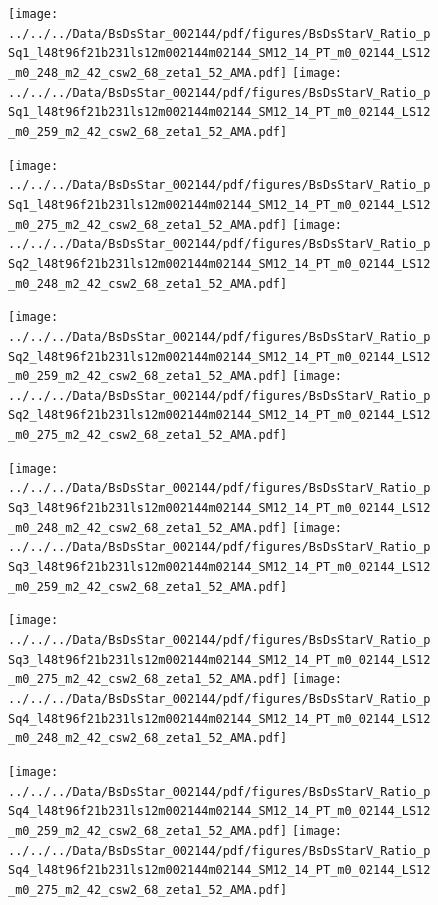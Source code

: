 \documentclass[a4paper,10pt]{article}
\begin{document}
\begin{figure}[p]
 \texttt{[image: ../../../Data/BsDsStar\_002144/pdf/figures/BsDsStarV\_Ratio\_pSq1\_l48t96f21b231ls12m002144m02144\_SM12\_14\_PT\_m0\_02144\_LS12\_m0\_248\_m2\_42\_csw2\_68\_zeta1\_52\_AMA.pdf]} 
 \texttt{[image: ../../../Data/BsDsStar\_002144/pdf/figures/BsDsStarV\_Ratio\_pSq1\_l48t96f21b231ls12m002144m02144\_SM12\_14\_PT\_m0\_02144\_LS12\_m0\_259\_m2\_42\_csw2\_68\_zeta1\_52\_AMA.pdf]} 
 \end{figure}
\begin{figure}[p]
 \texttt{[image: ../../../Data/BsDsStar\_002144/pdf/figures/BsDsStarV\_Ratio\_pSq1\_l48t96f21b231ls12m002144m02144\_SM12\_14\_PT\_m0\_02144\_LS12\_m0\_275\_m2\_42\_csw2\_68\_zeta1\_52\_AMA.pdf]} 
 \texttt{[image: ../../../Data/BsDsStar\_002144/pdf/figures/BsDsStarV\_Ratio\_pSq2\_l48t96f21b231ls12m002144m02144\_SM12\_14\_PT\_m0\_02144\_LS12\_m0\_248\_m2\_42\_csw2\_68\_zeta1\_52\_AMA.pdf]} 
 \end{figure}
\begin{figure}[p]
 \texttt{[image: ../../../Data/BsDsStar\_002144/pdf/figures/BsDsStarV\_Ratio\_pSq2\_l48t96f21b231ls12m002144m02144\_SM12\_14\_PT\_m0\_02144\_LS12\_m0\_259\_m2\_42\_csw2\_68\_zeta1\_52\_AMA.pdf]} 
 \texttt{[image: ../../../Data/BsDsStar\_002144/pdf/figures/BsDsStarV\_Ratio\_pSq2\_l48t96f21b231ls12m002144m02144\_SM12\_14\_PT\_m0\_02144\_LS12\_m0\_275\_m2\_42\_csw2\_68\_zeta1\_52\_AMA.pdf]} 
 \end{figure}
\clearpage
\begin{figure}[p]
 \texttt{[image: ../../../Data/BsDsStar\_002144/pdf/figures/BsDsStarV\_Ratio\_pSq3\_l48t96f21b231ls12m002144m02144\_SM12\_14\_PT\_m0\_02144\_LS12\_m0\_248\_m2\_42\_csw2\_68\_zeta1\_52\_AMA.pdf]} 
 \texttt{[image: ../../../Data/BsDsStar\_002144/pdf/figures/BsDsStarV\_Ratio\_pSq3\_l48t96f21b231ls12m002144m02144\_SM12\_14\_PT\_m0\_02144\_LS12\_m0\_259\_m2\_42\_csw2\_68\_zeta1\_52\_AMA.pdf]} 
 \end{figure}
\begin{figure}[p]
 \texttt{[image: ../../../Data/BsDsStar\_002144/pdf/figures/BsDsStarV\_Ratio\_pSq3\_l48t96f21b231ls12m002144m02144\_SM12\_14\_PT\_m0\_02144\_LS12\_m0\_275\_m2\_42\_csw2\_68\_zeta1\_52\_AMA.pdf]} 
 \texttt{[image: ../../../Data/BsDsStar\_002144/pdf/figures/BsDsStarV\_Ratio\_pSq4\_l48t96f21b231ls12m002144m02144\_SM12\_14\_PT\_m0\_02144\_LS12\_m0\_248\_m2\_42\_csw2\_68\_zeta1\_52\_AMA.pdf]} 
 \end{figure}
\begin{figure}[p]
 \texttt{[image: ../../../Data/BsDsStar\_002144/pdf/figures/BsDsStarV\_Ratio\_pSq4\_l48t96f21b231ls12m002144m02144\_SM12\_14\_PT\_m0\_02144\_LS12\_m0\_259\_m2\_42\_csw2\_68\_zeta1\_52\_AMA.pdf]} 
 \texttt{[image: ../../../Data/BsDsStar\_002144/pdf/figures/BsDsStarV\_Ratio\_pSq4\_l48t96f21b231ls12m002144m02144\_SM12\_14\_PT\_m0\_02144\_LS12\_m0\_275\_m2\_42\_csw2\_68\_zeta1\_52\_AMA.pdf]} 
 \end{figure}
\end{document}
